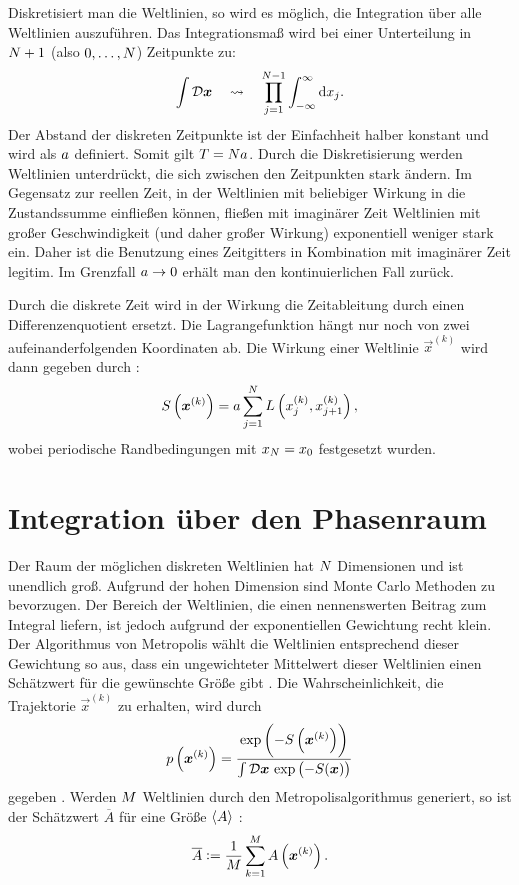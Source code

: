 Diskretisiert man die Weltlinien, so wird es möglich, die Integration über alle
Weltlinien auszuführen. Das Integrationsmaß wird bei einer Unterteilung in
$N+1$ (also $0, \ldots, N$) Zeitpunkte zu:
\[
    \int \funcmeasure
    \quad\leadsto\quad
    \prod_{j = 1}^{\timesites-1} \int_{-\infty}^\infty \dif x_j.
\]
Der Abstand der diskreten Zeitpunkte ist der Einfachheit halber konstant und
wird als $a$ definiert. Somit gilt $T = Na$. Durch die
Diskretisierung werden Weltlinien unterdrückt, die sich zwischen den
Zeitpunkten stark ändern. Im Gegensatz zur reellen Zeit, in der Weltlinien mit
beliebiger Wirkung in die Zustandssumme einfließen können, fließen mit
imaginärer Zeit Weltlinien mit großer Geschwindigkeit (und daher großer
Wirkung) exponentiell weniger stark ein. Daher ist die Benutzung eines
Zeitgitters in Kombination mit imaginärer Zeit legitim. Im Grenzfall $a
\to 0$ erhält man den kontinuierlichen Fall zurück.

Durch die diskrete Zeit wird in der Wirkung die Zeitableitung durch einen
Differenzenquotient ersetzt. Die Lagrangefunktion hängt nur noch von zwei
aufeinanderfolgenden Koordinaten ab. Die Wirkung einer Weltlinie $\vec x^{(k)}$
wird dann gegeben durch
\parencite[(3.2)]{Creutz/Statistical_Approach_QM}:
\[
    S\del{\vec x^{(k)}} = \timestep \sum_{j = 1}^\timesites L\del{x_j^{(k)},
    x_{j+1}^{(k)}},
\]
wobei periodische Randbedingungen mit $x_{N} = x_0$ festgesetzt wurden.

\section{Integration über den Phasenraum}

Der Raum der möglichen diskreten Weltlinien hat $N$ Dimensionen und
ist unendlich groß. Aufgrund der hohen Dimension sind Monte Carlo Methoden zu
bevorzugen. Der Bereich der Weltlinien, die einen nennenswerten Beitrag zum
Integral liefern, ist jedoch aufgrund der exponentiellen Gewichtung recht
klein. Der Algorithmus von Metropolis wählt die Weltlinien entsprechend dieser
Gewichtung so aus, dass ein ungewichteter Mittelwert dieser Weltlinien einen
Schätzwert für die gewünschte Größe gibt
\parencite[434]{Creutz/Statistical_Approach_QM}. Die Wahrscheinlichkeit, die
Trajektorie $\vec x^{(k)}$ zu erhalten, wird durch
\begin{equation}
    \label{eq:p_x_k}
    p\del{\vec x^{(k)}} = \frac{\exp\del{-S\del{\vec x^{(k)}}}}{\int
        \funcmeasure
    \, \exp\del{-S(\vec x)}}
\end{equation}
gegeben \parencite[(3.6)]{Creutz/Statistical_Approach_QM}. Werden $M$
Weltlinien durch den Metropolisalgorithmus generiert, so ist der Schätzwert
$\overline A$ für
eine Größe $\langle A \rangle$
\parencite[(3.7)]{Creutz/Statistical_Approach_QM}:
\[
    \overline A := \frac1\iterations \sum_{k=1}^\iterations A\del{\vec x^{(k)}}.
\]

